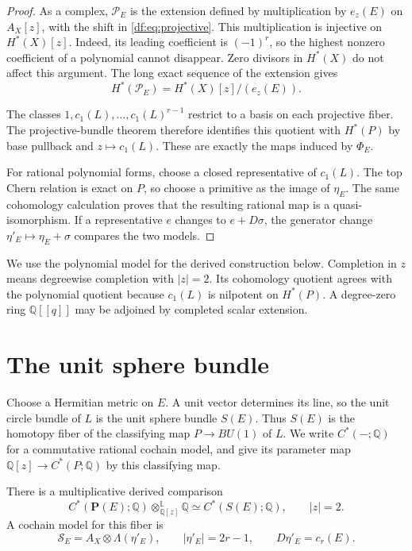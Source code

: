 \begin{proof}
As a complex, $\mathcal P_E$ is the extension defined by
multiplication by $e_z(E)$ on $A_X[z]$, with the shift in
\eqref{df:eq:projective}. This multiplication is injective on
$H^*(X)[z]$. Indeed, its leading coefficient is $(-1)^r$, so
the highest nonzero coefficient of a polynomial cannot disappear.
Zero divisors in $H^*(X)$ do not affect this argument. The long exact
sequence of the extension gives
\[
 H^*(\mathcal P_E)=H^*(X)[z]/(e_z(E)).
\]

The classes $1,c_1(L),\ldots,c_1(L)^{r-1}$ restrict to a basis on
each projective fiber. The projective-bundle theorem therefore identifies
this quotient with $H^*(P)$ by base pullback and $z\mapsto c_1(L)$.
These are exactly the maps induced by $\Phi_E$.

For rational polynomial forms, choose a closed representative of
$c_1(L)$. The top Chern relation is exact on $P$, so choose a primitive
as the image of $\eta_E$. The same cohomology calculation proves that
the resulting rational map is a quasi-isomorphism. If a representative
$e$ changes to $e+D\sigma$, the generator change
$\eta'_E\mapsto\eta_E+\sigma$ compares the two models.
\end{proof}

We use the polynomial model for the derived construction below.
Completion in $z$ means degreewise completion with $|z|=2$.
Its cohomology quotient agrees with the polynomial quotient because
$c_1(L)$ is nilpotent on $H^*(P)$. A degree-zero ring
$\mathbb Q[[q]]$ may be adjoined by completed scalar extension.

\section{The unit sphere bundle}
\label{df:sec:sphere}

Choose a Hermitian metric on $E$. A unit vector determines its line,
so the unit circle bundle of $L$ is the unit sphere bundle $S(E)$.
Thus $S(E)$ is the homotopy fiber of the classifying map
$P\to BU(1)$ of $L$. We write $C^*(-;\mathbb Q)$ for a commutative
rational cochain model, and give its parameter map
$\mathbb Q[z]\to C^*(P;\mathbb Q)$ by this classifying map.

\begin{theorem}\label{df:thm:sphere}
There is a multiplicative derived comparison
\begin{equation}\label{df:eq:derived-fiber}
 C^*(\mathbf P(E);\mathbb Q)
       \otimes^{\mathbb L}_{\mathbb Q[z]}\mathbb Q
 \simeq C^*(S(E);\mathbb Q),\qquad |z|=2.
\end{equation}
A cochain model for this fiber is
\begin{equation}\label{df:eq:sphere}
 \mathcal S_E=A_X\otimes\Lambda(\eta'_E),\qquad
 |\eta'_E|=2r-1,\qquad D\eta'_E=c_r(E).
\end{equation}
\end{theorem}

